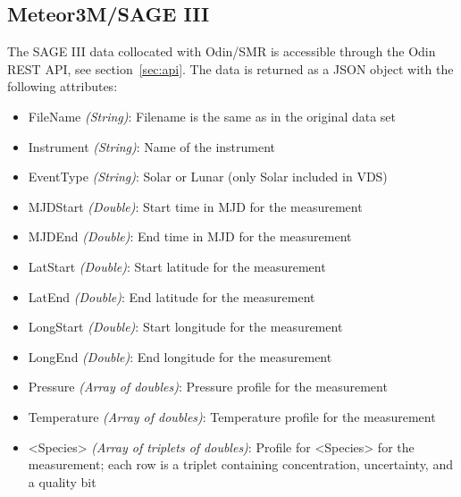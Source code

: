 \subsection{Meteor3M/SAGE III}
The SAGE III data collocated with Odin/SMR is accessible through the Odin REST
API, see section~\ref{sec:api}. The data is returned as a JSON object with the
following attributes:
\begin{itemize}
    \item FileName    \emph{(String)}: Filename is the same as in the original
        data set
    \item Instrument  \emph{(String)}: Name of the instrument
    \item EventType   \emph{(String)}: Solar or Lunar (only Solar included in
        VDS)
    \item MJDStart    \emph{(Double)}: Start time in MJD for the measurement
    \item MJDEnd      \emph{(Double)}: End time in MJD for the measurement
    \item LatStart    \emph{(Double)}: Start latitude for the measurement
    \item LatEnd      \emph{(Double)}: End latitude for the measurement
    \item LongStart   \emph{(Double)}: Start longitude for the measurement
    \item LongEnd     \emph{(Double)}: End longitude for the measurement
    \item Pressure    \emph{(Array of doubles)}: Pressure profile for the
        measurement
    \item Temperature \emph{(Array of doubles)}: Temperature profile for the
        measurement
    \item <Species>   \emph{(Array of triplets of doubles)}: Profile for
        <Species> for the measurement; each row is a triplet containing
        concentration, uncertainty, and a quality bit
\end{itemize}



